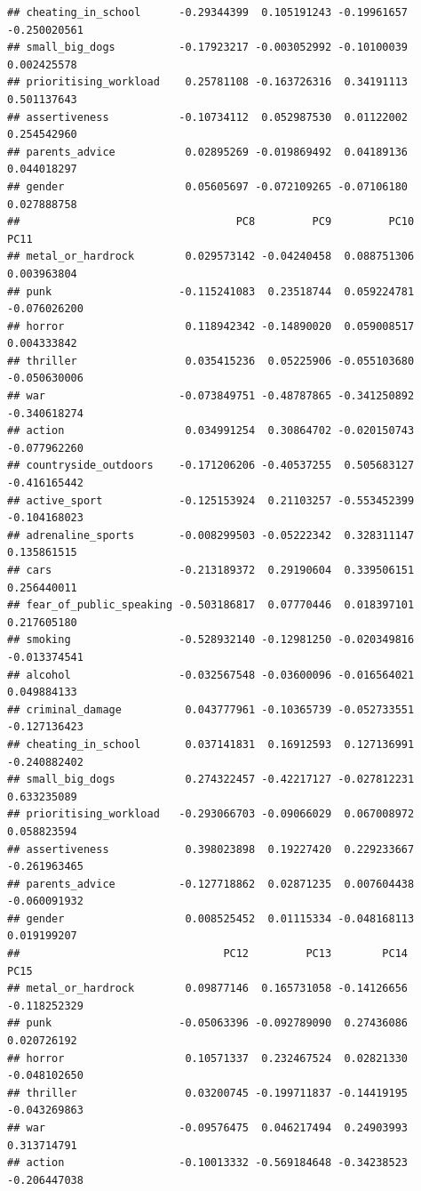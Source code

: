 \documentclass[]{article}
\begin{document}
\begin{verbatim}
## cheating_in_school      -0.29344399  0.105191243 -0.19961657 -0.250020561
## small_big_dogs          -0.17923217 -0.003052992 -0.10100039  0.002425578
## prioritising_workload    0.25781108 -0.163726316  0.34191113  0.501137643
## assertiveness           -0.10734112  0.052987530  0.01122002  0.254542960
## parents_advice           0.02895269 -0.019869492  0.04189136  0.044018297
## gender                   0.05605697 -0.072109265 -0.07106180  0.027888758
##                                  PC8         PC9         PC10         PC11
## metal_or_hardrock        0.029573142 -0.04240458  0.088751306  0.003963804
## punk                    -0.115241083  0.23518744  0.059224781 -0.076026200
## horror                   0.118942342 -0.14890020  0.059008517  0.004333842
## thriller                 0.035415236  0.05225906 -0.055103680 -0.050630006
## war                     -0.073849751 -0.48787865 -0.341250892 -0.340618274
## action                   0.034991254  0.30864702 -0.020150743 -0.077962260
## countryside_outdoors    -0.171206206 -0.40537255  0.505683127 -0.416165442
## active_sport            -0.125153924  0.21103257 -0.553452399 -0.104168023
## adrenaline_sports       -0.008299503 -0.05222342  0.328311147  0.135861515
## cars                    -0.213189372  0.29190604  0.339506151  0.256440011
## fear_of_public_speaking -0.503186817  0.07770446  0.018397101  0.217605180
## smoking                 -0.528932140 -0.12981250 -0.020349816 -0.013374541
## alcohol                 -0.032567548 -0.03600096 -0.016564021  0.049884133
## criminal_damage          0.043777961 -0.10365739 -0.052733551 -0.127136423
## cheating_in_school       0.037141831  0.16912593  0.127136991 -0.240882402
## small_big_dogs           0.274322457 -0.42217127 -0.027812231  0.633235089
## prioritising_workload   -0.293066703 -0.09066029  0.067008972  0.058823594
## assertiveness            0.398023898  0.19227420  0.229233667 -0.261963465
## parents_advice          -0.127718862  0.02871235  0.007604438 -0.060091932
## gender                   0.008525452  0.01115334 -0.048168113  0.019199207
##                                PC12         PC13        PC14         PC15
## metal_or_hardrock        0.09877146  0.165731058 -0.14126656 -0.118252329
## punk                    -0.05063396 -0.092789090  0.27436086  0.020726192
## horror                   0.10571337  0.232467524  0.02821330 -0.048102650
## thriller                 0.03200745 -0.199711837 -0.14419195 -0.043269863
## war                     -0.09576475  0.046217494  0.24903993  0.313714791
## action                  -0.10013332 -0.569184648 -0.34238523 -0.206447038

\end{verbatim}
\end{document}
